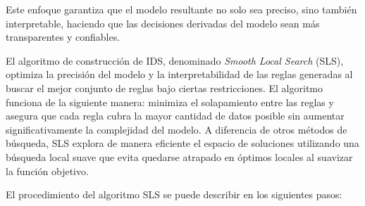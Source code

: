 Este enfoque garantiza que el modelo resultante no solo sea preciso, sino también interpretable, haciendo que las decisiones derivadas del modelo sean más transparentes y confiables.

El algoritmo de construcción de IDS, denominado \textit{Smooth Local Search} (SLS), optimiza la precisión del modelo y la interpretabilidad de las reglas generadas al buscar el mejor conjunto de reglas bajo ciertas restricciones. El algoritmo funciona de la siguiente manera: minimiza el solapamiento entre las reglas y asegura que cada regla cubra la mayor cantidad de datos posible sin aumentar significativamente la complejidad del modelo. A diferencia de otros métodos de búsqueda, SLS explora de manera eficiente el espacio de soluciones utilizando una búsqueda local suave que evita quedarse atrapado en óptimos locales al suavizar la función objetivo.

El procedimiento del algoritmo SLS se puede describir en los siguientes pasos:

